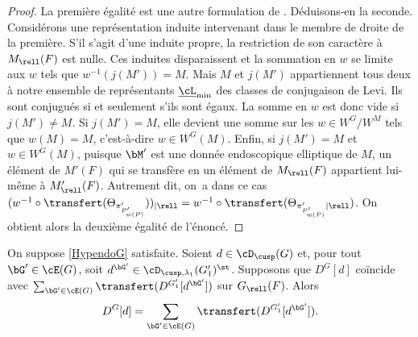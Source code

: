 \begin{proof}
La première égalité est une autre formulation de \cite[Th.\,5.6]{H}. Déduisons-en la seconde. Considérons une représentation induite intervenant dans le membre de droite de la première. S'il s'agit d'une induite propre, la restriction de son caractère à $M_{\rell}(F)$ est nulle. Ces induites disparaissent et la sommation en $w$ se limite aux $w$ tels que $w^{-1}(j(M'))=M$. Mais $M$ et $j(M')$ appartiennent tous deux à notre ensemble de représentants $\underline{\cL}_{\min}$ des classes de conjugaison de Levi. Ils sont conjugués si et seulement s'ils sont égaux. La somme en $w$ est donc vide si $j(M')\neq M$. Si $j(M')=M$, elle devient une somme sur les $w\in W^G/W^M$ tels que $w(M)=M$, c'est-à-dire $w\in W^G(M)$. Enfin, si $j(M')=M$ et $w\in W^G(M)$, puisque $\bM'$ est une donnée endoscopique elliptique de $M$, un élément de $M'(F)$ qui se transfère en un élément de $M_{\rell}(F)$ appartient lui-même à $M'_{\rell}(F)$. Autrement dit, on~a dans ce cas $(w^{-1}\circ \transfert(\Theta_{\pi'_{P'_{w(P)}}}))_{\vert\rell}=w^{-1}\circ \transfert(\Theta_{\pi'_{P'_{w(P)}}\vert\rell})$. On obtient alors la deuxième égalité de l'énoncé.
\end{proof}

\label{finale}

\begin{prop*}
On suppose \ref{HypendoG} satisfaite. Soient $d\in \cD_{\cusp}(G)$ et, pour tout $\bG'\in \cE(G)$, soit $d^{\bG'}\in \cD_{\cusp,\lambda_{1}}(G'_{1})^{\st}$. Supposons que $D^G[d]$ coïncide avec $\sum_{\bG'\in \cE(G)}\transfert(D^{G'_{1}}[d^{\bG'}])$ sur $G_{\rell}(F)$. Alors\vspace*{-3pt}
\[
D^G[d]=\sum_{\bG'\in \cE(G)}\transfert(D^{G'_{1}}[d^{\bG'}]).
\]
\end{prop*}

